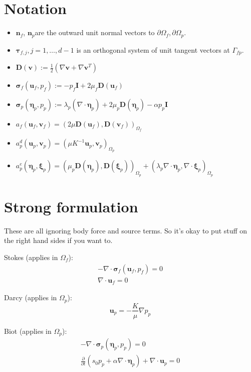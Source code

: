 \documentclass{article}
\newcommand{\D}{\ensuremath{\mathbf{D}}}
\newcommand{\sigmabf}{\ensuremath{\boldsymbol{\sigma}}}
\newcommand{\taubf}{\ensuremath{\boldsymbol{\tau}}}
\newcommand{\grad}{\ensuremath{\nabla}}
\renewcommand{\div}{\ensuremath{\nabla \cdot}}
\newcommand{\inner}[2]{\ensuremath{\left (#1, #2 \right)}}
\newcommand{\defeq}{\ensuremath{:=}}
\newcommand{\ddt}[1]{\ensuremath{\frac {\partial #1} {\partial t}}}
\newcommand{\stokes}{\ensuremath{\Omega_{f}}}
\newcommand{\darcy}{\ensuremath{\Omega_{p}}}
\newcommand{\interface}{\ensuremath{\Gamma_{fp}}}
\newcommand{\nf}{\ensuremath{\mathbf{n}_f}}
\newcommand{\np}{\ensuremath{\mathbf{n}_p}}
\newcommand{\uf}{\ensuremath{\mathbf{u}_f}}
\newcommand{\vf}{\ensuremath{\mathbf{v}_f}}
\newcommand{\up}{\ensuremath{\mathbf{u}_p}}
\newcommand{\vp}{\ensuremath{\mathbf{v}_p}}
\newcommand{\pf}{\ensuremath{p_f}}
\newcommand{\pp}{\ensuremath{p_p}}
\newcommand{\disp}{\ensuremath{\boldsymbol{\eta}_p}}
\newcommand{\disptest}{\ensuremath{\boldsymbol{\xi}_p}}
\begin{document}
\section{Notation}
\begin{itemize}
\item \nf, \np are the outward unit normal vectors to $\partial \stokes, \partial \darcy$. 
\item $\taubf_{f, j}, j = 1, \ldots, d-1$ is an orthogonal system of unit tangent vectors at \interface.
\item $\D(\mathbf{v}) \defeq \frac 12 (\grad \mathbf{v} + \grad \mathbf{v}^T)$
\item $\sigmabf_f(\uf, \pf) \defeq -\pf \mathbf{I} + 2 \mu_f \D(\uf)$
\item $\sigmabf_p(\disp, \pp) \defeq \lambda_p (\div \disp) + 2 \mu_p \D(\disp) - \alpha \pp \mathbf{I} $
  
\item $a_f(\uf, \vf) = \inner{2\mu \D(\uf)} {\D(\vf)}_{\stokes}$
\item $a_p^d(\up, \vp) = \inner{\mu K^{-1}\up} {\vp}_{\darcy}$
\item $a_p^e(\disp, \disptest) = \inner{\mu_p \D(\disp)} {\D(\disptest)}_{\darcy} + \inner{\lambda_p \div \disp} {\div \disptest}_{\darcy}$
  
\end{itemize}


\section{Strong formulation}
These are all ignoring body force and source terms. So it's okay to put stuff on the right hand sides if you want to.

Stokes (applies in \stokes):
\begin{subequations}
  \begin{align}
    - \div \sigmabf_f (\uf, \pf) = 0    \label{eq:stokes_stress} \\
    \div \uf = 0    \label{eq:stokes_conservation}
  \end{align}
\end{subequations}

Darcy (applies in \darcy):
\begin{equation}
    \up = - \frac {K} {\mu} \grad \pp     \label{eq:darcy}
  \end{equation}

  
Biot (applies in \darcy):
\begin{subequations}
  \begin{align}
    - \div \sigmabf_p (\disp, \pp) = 0     \label{eq:biot_stress} \\
    \ddt{} \left ( s_0 \pp + \alpha \div \disp \right ) + \div \up = 0    \label{eq:biot_conservation}
  \end{align}
\end{subequations}
\end{document}
